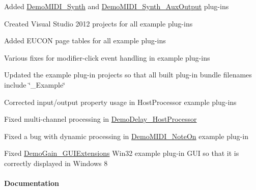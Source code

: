 \begin{DoxyItemize}
\item Added \mbox{\hyperlink{a00848_DemoMIDI_Synth}{Demo\+M\+I\+D\+I\+\_\+\+Synth}} and \mbox{\hyperlink{a00848_DemoMIDI_Synth_AuxOutput}{Demo\+M\+I\+D\+I\+\_\+\+Synth\+\_\+\+Aux\+Output}} plug-\/ins 
\item Created Visual Studio 2012 projects for all example plug-\/ins 
\item Added E\+U\+C\+ON page tables for all example plug-\/ins 
\item Various fixes for modifier-\/click event handling in example plug-\/ins 
\item Updated the example plug-\/in projects so that all built plug-\/in bundle filenames include \char`\"{}\+\_\+\+Example\char`\"{} 
\item Corrected input/output property usage in Host\+Processor example plug-\/ins 
\item Fixed multi-\/channel processing in \mbox{\hyperlink{a00848_DemoDelay_HostProcessor}{Demo\+Delay\+\_\+\+Host\+Processor}} 
\item Fixed a bug with dynamic processing in \mbox{\hyperlink{a00848_DemoMIDI_NoteOn}{Demo\+M\+I\+D\+I\+\_\+\+Note\+On}} example plug-\/in 
\item Fixed \mbox{\hyperlink{a00848_DemoGain_GUIExtensions}{Demo\+Gain\+\_\+\+G\+U\+I\+Extensions}} Win32 example plug-\/in G\+UI so that it is correctly displayed in Windows 8 
\end{DoxyItemize}\hypertarget{a00847_aax_sdk_2p2p0_Documentation}{}\paragraph{Documentation}\label{a00847_aax_sdk_2p2p0_Documentation}

